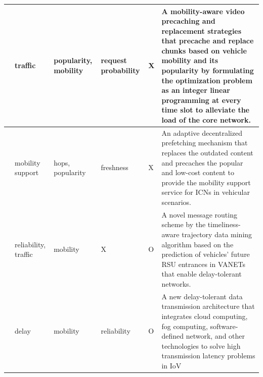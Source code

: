 \documentclass[journal]{IEEEtran}
\begin{document}
\begin{table}
\begin{tabular}{C{0.05\textwidth}|C{0.05\textwidth}|C{0.1\textwidth}|C{0.1\textwidth}|C{0.05\textwidth}|L{0.5\textwidth}}
        \hline
        \cite{Liu2018} & traffic & popularity, mobility & request probability & X & 
                 A mobility-aware video precaching and replacement strategies that precache and replace chunks based on vehicle mobility and its popularity by formulating the optimization problem as an integer linear programming at every time slot to alleviate the load of the core network. \\
        \hline
        \cite{Grewe2018} & mobility support & hops, popularity & freshness & X & 
                An adaptive decentralized prefetching mechanism that replaces the outdated content and precaches the popular and low-cost content to provide the mobility support service for ICNs in vehicular scenarios. \\
        \hline
        \cite{Qi2017} & reliability, traffic & mobility & X & O & 
                A novel message routing scheme by the timeliness-aware trajectory data mining algorithm based on the prediction of vehicles' future RSU entrances in VANETs that enable delay-tolerant networks. \\
        \hline
        \cite{Xia2020} & delay & mobility & reliability & O & 
                A new delay-tolerant data transmission architecture that integrates cloud computing, fog computing, software-defined network, and other technologies to solve high transmission latency problems in IoV\\
        \hline
        \hline    
    \end{tabular}
    \label{tab:mob}
\end{table}
\end{document}
